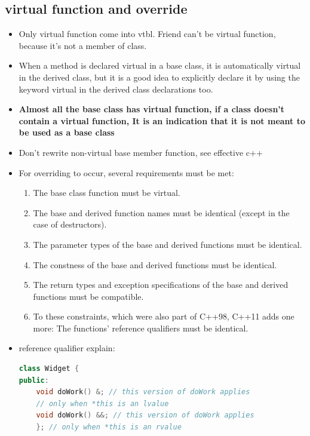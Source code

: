 \documentclass[a4paper,11pt,twoside]{book}
\begin{document}
\subsection{virtual function and override}
\begin{itemize}
	
	\item Only virtual function come into vtbl. Friend can't be virtual function, because it's not a member of class.
	
	\item When a method is declared virtual in a base class, it is automatically virtual in the derived class, but it is a good idea to explicitly declare it by using the keyword virtual in the derived class declarations too.
	
	\item \textbf{Almost all the base class has virtual function, if a class doesn't contain a virtual function, It is an indication that it is not meant to be used as a base class}
	
	\item Don't rewrite non-virtual base member function, see effective c++
	
	\item For overriding to occur, several requirements must be met:
	\begin{enumerate}
		\item The base class function must be virtual.
		\item The base and derived function names must be identical (except in the case of
		destructors).
		\item The parameter types of the base and derived functions must be identical.
		\item The constness of the base and derived functions must be identical.
		\item The return types and exception specifications of the base and derived functions
		must be compatible.
		\item To these constraints, which were also part of C++98, C++11 adds one more: The functions' reference qualifiers must be identical.
	\end{enumerate}
	\item reference qualifier explain:
\begin{lstlisting}[frame=single, language=c++]
class Widget {
public:
	void doWork() &; // this version of doWork applies
	// only when *this is an lvalue
	void doWork() &&; // this version of doWork applies
	}; // only when *this is an rvalue
	

\end{lstlisting}
\end{itemize}
\end{document}
